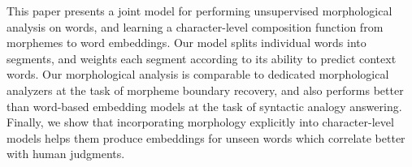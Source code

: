 This paper presents a joint model for performing unsupervised morphological analysis on words, and learning a character-level composition function from morphemes to word embeddings. Our model splits individual words into segments, and weights each segment according to its ability to predict context words. Our morphological analysis is comparable to dedicated morphological analyzers at the task of morpheme boundary recovery, and also performs better than word-based embedding models at the task of syntactic analogy answering. Finally, we show that incorporating morphology explicitly into character-level models helps them produce embeddings for unseen words which correlate better with human judgments.
